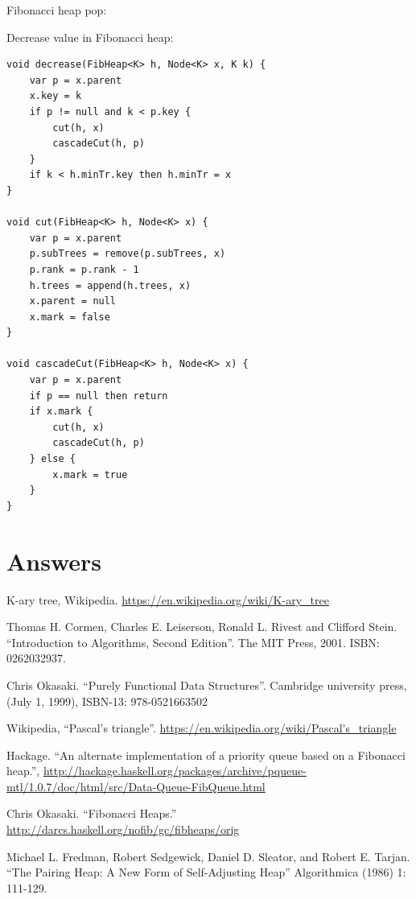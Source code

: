 \documentclass[b5paper]{article}
\begin{document}
Fibonacci heap pop:


Decrease value in Fibonacci heap:

\begin{lstlisting}[language = Bourbaki]
void decrease(FibHeap<K> h, Node<K> x, K k) {
    var p = x.parent
    x.key = k
    if p != null and k < p.key {
        cut(h, x)
        cascadeCut(h, p)
    }
    if k < h.minTr.key then h.minTr = x
}

void cut(FibHeap<K> h, Node<K> x) {
    var p = x.parent
    p.subTrees = remove(p.subTrees, x)
    p.rank = p.rank - 1
    h.trees = append(h.trees, x)
    x.parent = null
    x.mark = false
}

void cascadeCut(FibHeap<K> h, Node<K> x) {
    var p = x.parent
    if p == null then return
    if x.mark {
        cut(h, x)
        cascadeCut(h, p)
    } else {
        x.mark = true
    }
}
\end{lstlisting}

\ifx\wholebook\relax \else
\section{Answers}
\shipoutAnswer

\begin{thebibliography}{99}

K-ary tree, Wikipedia. \url{https://en.wikipedia.org/wiki/K-ary_tree}

Thomas H. Cormen, Charles E. Leiserson, Ronald L. Rivest and Clifford Stein. ``Introduction to Algorithms, Second Edition''. The MIT Press, 2001. ISBN: 0262032937.

Chris Okasaki. ``Purely Functional Data Structures''. Cambridge university press, (July 1, 1999), ISBN-13: 978-0521663502

Wikipedia, ``Pascal's triangle''. \url{https://en.wikipedia.org/wiki/Pascal's_triangle}

Hackage. ``An alternate implementation of a priority queue based on a Fibonacci heap.'', \url{http://hackage.haskell.org/packages/archive/pqueue-mtl/1.0.7/doc/html/src/Data-Queue-FibQueue.html}

Chris Okasaki. ``Fibonacci Heaps.'' \url{http://darcs.haskell.org/nofib/gc/fibheaps/orig}

Michael L. Fredman, Robert Sedgewick, Daniel D. Sleator, and Robert E. Tarjan. ``The Pairing Heap: A New Form of Self-Adjusting Heap'' Algorithmica (1986) 1: 111-129.

\end{thebibliography}

\expandafter\enddocument
\fi
\end{document}
